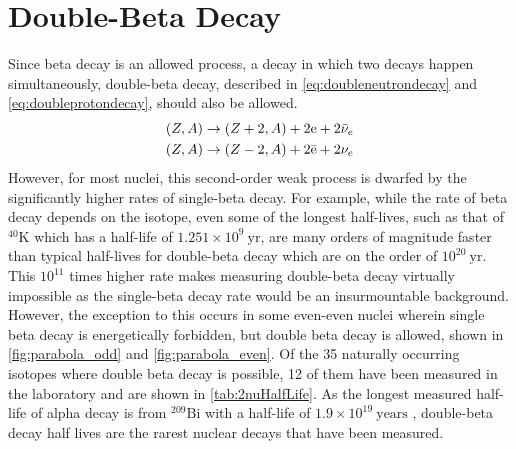 \section{Double-Beta Decay}
\label{sec:Double Beta Decay}
Since beta decay is an allowed process, a decay in which two decays happen simultaneously, double-beta decay, described in \autoref{eq:doubleneutrondecay} and \autoref{eq:doubleprotondecay}, should also be allowed.
\begin{align}
    (Z, A) & \rightarrow (Z+2, A)+2\textrm{e}+2\Bar{\nu}_e \label{eq:doubleneutrondecay} \\
    (Z, A) & \rightarrow (Z-2, A)+2\Bar{\textrm{e}}+2\nu_e \label{eq:doubleprotondecay} 
\end{align}
However, for most nuclei, this second-order weak process is dwarfed by the significantly higher rates of single-beta decay. For example, while the rate of beta decay depends on the isotope, even some of the longest half-lives, such as that of $^{40}$K which has a half-life of $1.251\times10^{9}~\textrm{yr}$, are many orders of magnitude faster than typical half-lives for double-beta decay which are on the order of $10^{20}~\textrm{yr}$. This $10^{11}$ times higher rate makes measuring double-beta decay virtually impossible as the single-beta decay rate would be an insurmountable background. However, the exception to this occurs in some even-even nuclei wherein single beta decay is energetically forbidden, but double beta decay is allowed, shown in \autoref{fig:parabola_odd} and \autoref{fig:parabola_even}. Of the 35 naturally occurring isotopes where double beta decay is possible, 12 of them have been measured in the laboratory and are shown in \autoref{tab:2nuHalfLife}. As the longest measured half-life of alpha decay is from $^{209}\textrm{Bi}$ with a half-life of $1.9 \times 10^{19}~\textrm{years}$ \cite{Marcillac:2003Bi-209detection}, double-beta decay half lives are the rarest nuclear decays that have been measured.

